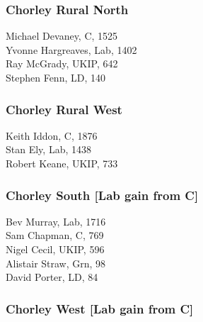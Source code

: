 \documentclass[a4paper,openany,10pt]{book}
\begin{document}
\subsubsection*{Chorley Rural North}



Michael Devaney, C, 1525\\
Yvonne Hargreaves, Lab, 1402\\
Ray McGrady, UKIP, 642\\
Stephen Fenn, LD, 140\\


\subsubsection*{Chorley Rural West}



Keith Iddon, C, 1876\\
Stan Ely, Lab, 1438\\
Robert Keane, UKIP, 733\\


\subsubsection*{Chorley South \hspace*{\fill}\nolinebreak[1]%
\enspace\hspace*{\fill}
[Lab gain from C]}



Bev Murray, Lab, 1716\\
Sam Chapman, C, 769\\
Nigel Cecil, UKIP, 596\\
Alistair Straw, Grn, 98\\
David Porter, LD, 84\\


\subsubsection*{Chorley West \hspace*{\fill}\nolinebreak[1]%
\enspace\hspace*{\fill}
[Lab gain from C]}

\end{document}
